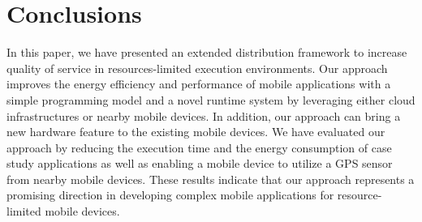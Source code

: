\documentclass{sig-alternate}
\begin{document}
\section{Conclusions}
\label{sec:conc}
%
In this paper, we have presented an extended distribution framework to increase quality of service in resources-limited execution environments. Our approach improves the energy efficiency and performance of mobile applications with a simple programming model and a novel runtime system by leveraging either cloud infrastructures or nearby mobile devices. In addition, our approach can bring a new hardware feature to the existing mobile devices. We have evaluated our approach by reducing the execution time and the energy consumption of case study applications as well as enabling a mobile device to utilize a GPS sensor from nearby mobile devices. These results indicate that our approach represents a promising direction in developing complex mobile applications for resource-limited mobile devices.


\balance


\end{document}
